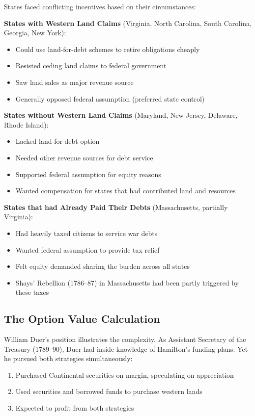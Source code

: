 \documentclass[12pt]{article}
\begin{document}
States faced conflicting incentives based on their circumstances:

\textbf{States with Western Land Claims} (Virginia, North Carolina, South Carolina, Georgia, New York):
\begin{itemize}
\item Could use land-for-debt schemes to retire obligations cheaply
\item Resisted ceding land claims to federal government
\item Saw land sales as major revenue source
\item Generally opposed federal assumption (preferred state control)
\end{itemize}

\textbf{States without Western Land Claims} (Maryland, New Jersey, Delaware, Rhode Island):
\begin{itemize}
\item Lacked land-for-debt option
\item Needed other revenue sources for debt service
\item Supported federal assumption for equity reasons
\item Wanted compensation for states that had contributed land and resources
\end{itemize}

\textbf{States that had Already Paid Their Debts} (Massachusetts, partially Virginia):
\begin{itemize}
\item Had heavily taxed citizens to service war debts
\item Wanted federal assumption to provide tax relief
\item Felt equity demanded sharing the burden across all states
\item Shays' Rebellion (1786--87) in Massachusetts had been partly triggered by these taxes
\end{itemize}

\subsection{The Option Value Calculation}

William Duer's position illustrates the complexity. As Assistant Secretary of the Treasury (1789--90), Duer had inside knowledge of Hamilton's funding plans. Yet he pursued both strategies simultaneously:

\begin{enumerate}
\item Purchased Continental securities on margin, speculating on appreciation
\item Used securities and borrowed funds to purchase western lands
\item Expected to profit from both strategies
\end{enumerate}
\end{document}
